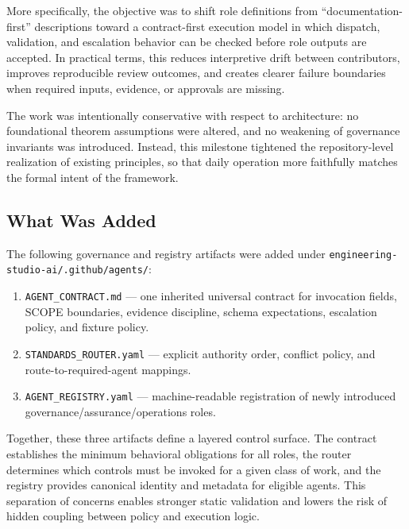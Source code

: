 \documentclass[12pt]{article}
\newcommand{\code}[1]{\texttt{#1}}
\begin{document}
More specifically, the objective was to shift role definitions from
``documentation-first'' descriptions toward a contract-first execution
model in which dispatch, validation, and escalation behavior can be
checked before role outputs are accepted. In practical terms, this
reduces interpretive drift between contributors, improves reproducible
review outcomes, and creates clearer failure boundaries when required
inputs, evidence, or approvals are missing.

The work was intentionally conservative with respect to architecture:
no foundational theorem assumptions were altered, and no weakening of
governance invariants was introduced. Instead, this milestone tightened
the repository-level realization of existing principles, so that daily
operation more faithfully matches the formal intent of the framework.

\subsection{What Was Added}

\begin{sloppypar}
The following governance and registry artifacts were added under
\code{engineering-studio-ai/.github/\allowbreak agents/}:
\end{sloppypar}
\begin{enumerate}
    \item \code{AGENT\_CONTRACT.md} --- one inherited universal contract
          for invocation fields, SCOPE boundaries, evidence discipline,
          schema expectations, escalation policy, and fixture policy.
    \item \code{STANDARDS\_ROUTER.yaml} --- explicit authority order,
          conflict policy, and route-to-required-agent mappings.
    \item \code{AGENT\_REGISTRY.yaml} --- machine-readable registration of
          newly introduced governance/assurance/operations roles.
\end{enumerate}

Together, these three artifacts define a layered control surface. The
contract establishes the minimum behavioral obligations for all roles,
the router determines which controls must be invoked for a given class
of work, and the registry provides canonical identity and metadata for
eligible agents. This separation of concerns enables stronger static
validation and lowers the risk of hidden coupling between policy and
execution logic.
\end{document}

